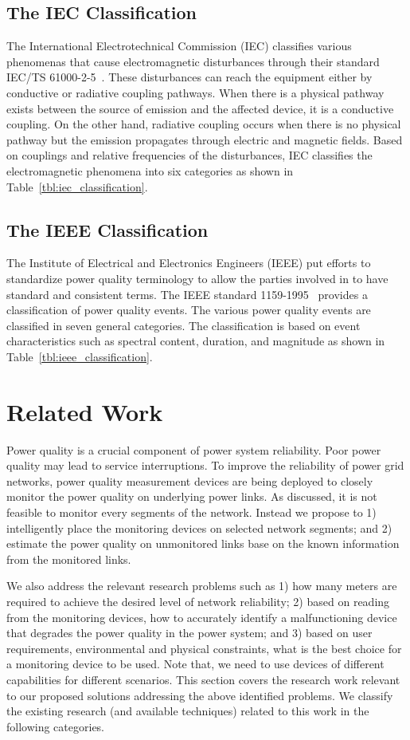 \subsection{The IEC Classification}
The International Electrotechnical Commission (IEC) classifies various phenomenas that cause electromagnetic disturbances through their standard IEC/TS 61000-2-5~\cite{iec_61000}. These disturbances can reach the equipment either by conductive or radiative coupling pathways. When there is a physical pathway exists between the source of emission and the affected device, it is a conductive coupling. On the other hand, radiative coupling occurs when there is no physical pathway but the emission propagates through electric and magnetic fields. Based on couplings and relative frequencies of the disturbances, IEC classifies the electromagnetic phenomena into six categories as shown in Table~\ref{tbl:iec_classification}.

\subsection{The IEEE Classification}
The Institute of Electrical and Electronics Engineers (IEEE) put efforts to standardize power quality terminology to allow the parties involved in to have standard and consistent terms. The IEEE standard 1159-1995~\cite{IEEE09_1159} provides a classification of power quality events. The various power quality events are classified in seven general categories. The classification is based on event characteristics such as spectral content, duration, and magnitude as shown in Table~\ref{tbl:ieee_classification}.

\section{Related Work}
Power quality is a crucial component of power system reliability. Poor power quality may lead to service interruptions. To improve the reliability of power grid networks, power quality measurement devices are being deployed to closely monitor the  power quality on underlying power links. As discussed, it is not feasible to monitor every segments of the network. Instead we propose to 1) intelligently place the monitoring devices on selected network segments; and 2) estimate the power quality on unmonitored links base on the known information from the monitored links.

We also address the relevant research problems such as 1) how many meters are required to achieve the desired level of network reliability; 2) based on reading from the monitoring devices, how to accurately identify a malfunctioning device that degrades the power quality in the power system; and 3) based on user requirements, environmental and physical constraints, what is the best choice for a monitoring device to be used. Note that, we need to use devices of different capabilities for different scenarios. This section covers the research work relevant to our proposed solutions addressing the above identified problems. We classify the existing research (and available techniques) related to this work in the following categories.

